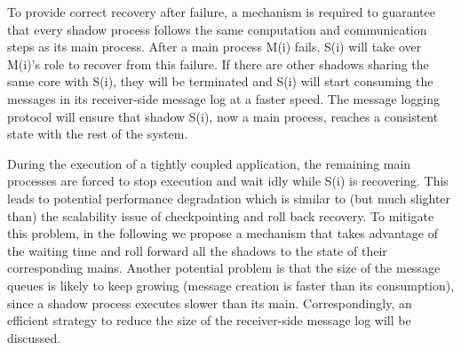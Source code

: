 To provide correct recovery after failure, 
a mechanism is required to guarantee that every shadow process follows the same computation and communication steps as its main process. 
After a main process M(i) fails, S(i) will take over M(i)'s role to recover from this failure. If there are other shadows sharing the same core with S(i), they will be terminated and S(i)
will start consuming the messages in its receiver-side message log at a faster speed. The message logging protocol will ensure that shadow S(i), now a main process, reaches a consistent state with the rest of the system. 

During the execution of a tightly coupled application, the remaining main processes are forced to stop execution and wait idly while S(i) is recovering. This leads to potential performance degradation which is similar to (but much slighter than) the scalability issue of checkpointing and roll back recovery. To mitigate this problem, in the following we propose a mechanism that takes advantage of the waiting time and roll forward all the shadows to the state of their corresponding mains.
Another potential problem is that the size of the message queues is likely to keep growing (message creation is faster than its consumption), since a shadow process executes slower than its main. Correspondingly, an efficient strategy to reduce the size of the receiver-side message log will be discussed.
